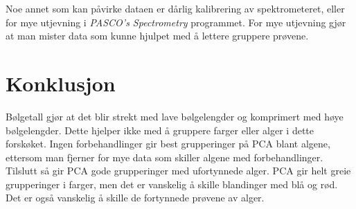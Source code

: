 \documentclass[twocolumn, 11pt]{article} %
\begin{document}
Noe annet som kan påvirke dataen er dårlig kalibrering av spektrometeret, eller for mye utjevning i \textit{PASCO's Spectrometry} programmet. For mye utjevning gjør at man mister data som kunne hjulpet med å lettere gruppere prøvene.


\section{Konklusjon}

Bølgetall gjør at det blir strekt med lave bølgelengder og komprimert med høye bølgelengder. Dette hjelper ikke med å gruppere farger eller alger i dette forskøket. Ingen forbehandlinger gir best grupperinger på PCA blant algene, ettersom man fjerner for mye data som skiller algene med forbehandlinger. Tilslutt så gir PCA  gode grupperinger med ufortynnede alger. PCA gir helt greie grupperinger i farger, men det er vanskelig å skille blandinger med blå og rød. Det er også vanskelig å skille de fortynnede prøvene av alger.



\end{document}
